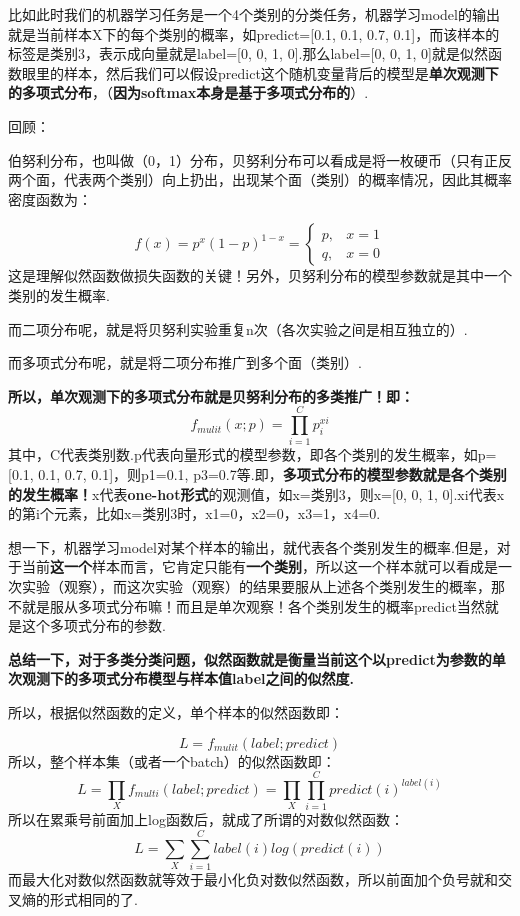 比如此时我们的机器学习任务是一个4个类别的分类任务，机器学习model的输出就是当前样本X下的每个类别的概率，如predict={[}0.1,
0.1, 0.7, 0.1{]}，而该样本的标签是类别3，表示成向量就是label={[}0, 0, 1,
0{]}.那么label={[}0, 0, 1,
0{]}就是似然函数眼里的样本，然后我们可以假设predict这个随机变量背后的模型是\textbf{单次观测下的多项式分布}，（\textbf{因为softmax本身是基于多项式分布的}）.

回顾：

伯努利分布，也叫做（0，1）分布，贝努利分布可以看成是将一枚硬币（只有正反两个面，代表两个类别）向上扔出，出现某个面（类别）的概率情况，因此其概率密度函数为：

\[
f(x)=p^x(1-p)^{1-x}=
\begin{cases}
p,& x=1\\
q,& x=0
\end{cases}
\]
这是理解似然函数做损失函数的关键！另外，贝努利分布的模型参数就是其中一个类别的发生概率.

而二项分布呢，就是将贝努利实验重复n次（各次实验之间是相互独立的）.

而多项式分布呢，就是将二项分布推广到多个面（类别）.

\textbf{所以，单次观测下的多项式分布就是贝努利分布的多类推广！即：} \[
f_{mulit}(x;p)=\prod_{i=1}^C p_{i}^{xi}
\]
其中，C代表类别数.p代表向量形式的模型参数，即各个类别的发生概率，如p={[}0.1,
0.1, 0.7, 0.1{]}，则p1=0.1,
p3=0.7等.即，\textbf{多项式分布的模型参数就是各个类别的发生概率！}x代表\textbf{one-hot形式}的观测值，如x=类别3，则x={[}0,
0, 1, 0{]}.xi代表x的第i个元素，比如x=类别3时，x1=0，x2=0，x3=1，x4=0.

想一下，机器学习model对某个样本的输出，就代表各个类别发生的概率.但是，对于当前\textbf{这一个}样本而言，它肯定只能有\textbf{一个类别}，所以这一个样本就可以看成是一次实验（观察），而这次实验（观察）的结果要服从上述各个类别发生的概率，那不就是服从多项式分布嘛！而且是单次观察！各个类别发生的概率predict当然就是这个多项式分布的参数.

\textbf{总结一下，对于多类分类问题，似然函数就是衡量当前这个以predict为参数的单次观测下的多项式分布模型与样本值label之间的似然度.}

所以，根据似然函数的定义，单个样本的似然函数即：

\[
L = f_{mulit}(label;predict)
\] 所以，整个样本集（或者一个batch）的似然函数即： \[
L=\prod_{X}f_{multi}(label;predict)= \prod_{X}\prod_{i=1}^{C}predict(i)^{label(i)}
\] 所以在累乘号前面加上log函数后，就成了所谓的对数似然函数： \[
L=\sum_{X}\sum_{i=1}^{C}label(i)log(predict(i))
\]
而最大化对数似然函数就等效于最小化负对数似然函数，所以前面加个负号就和交叉熵的形式相同的了.


